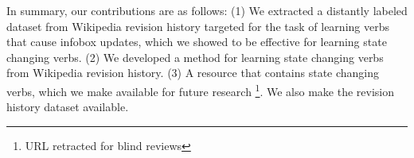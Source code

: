 In summary, our contributions are as follows: (1) We  extracted a  distantly labeled dataset from Wikipedia revision history targeted for the task of  learning verbs that cause  infobox updates, which we showed to be effective for learning state changing verbs.  (2) We developed a method for learning state changing verbs from Wikipedia revision history.
(3) A resource that contains state changing verbs, which we make available for future research \footnote{URL retracted for blind reviews}. We also make the revision history dataset available.
